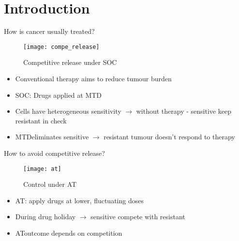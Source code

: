 \section{Introduction}

\begin{frame}{How is cancer usually treated?}
      \begin{figure}[h]
        \centering
        \texttt{[image: compe\_release]}
        \caption{Competitive release under SOC\footnotemark[1]}
      \end{figure}
      \begin{itemize}
        \item<1-> Conventional therapy aims to reduce tumour burden \cite{Frei}
        \item<2-> SOC\footnotemark[1]: Drugs applied at MTD\footnotemark[2]
        \item<3-> Cells have heterogeneous sensitivity $\rightarrow$ without therapy - sensitive keep resistant in check
        \item<4-> MTD\footnotemark[2] eliminates sensitive $\rightarrow$ resistant tumour doesn't respond to therapy \cite{Scott}
      \end{itemize}
\end{frame}

\begin{frame}{How to avoid competitive release?}
  \begin{figure}[h]
    \centering
    \texttt{[image: at]}
    \caption{Control under AT\footnotemark[1]}
  \end{figure}
  \begin{itemize}
    \item<1-> AT\footnotemark[1]: apply drugs at lower, fluctuating doses \cite{Gatenby}
    \item<2-> During drug holiday $\rightarrow$ sensitive compete with resistant
    \item<3-> AT\footnotemark[1] outcome depends on competition
  \end{itemize}
\end{frame}

